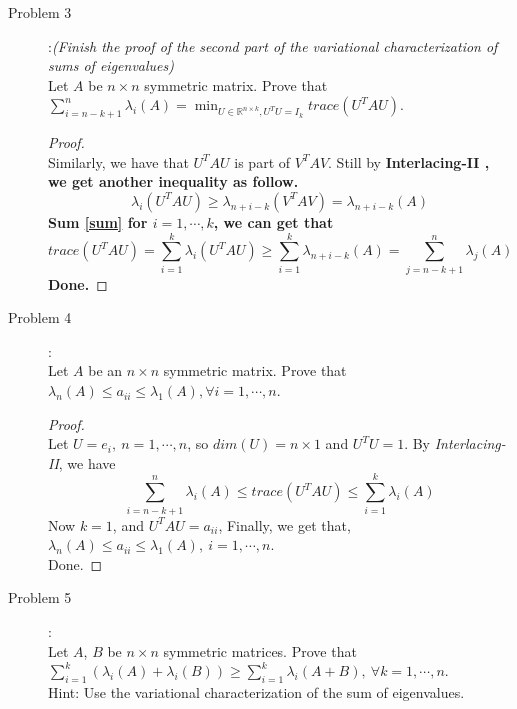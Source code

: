 \documentclass[a4paper]{article}
\begin{document}
\begin{description}
  \item[Problem 3]:\textit{(Finish the proof of the second part of the variational characterization of sums of eigenvalues)}\\
  Let $A$ be $n\times n$ symmetric matrix. Prove that $\sum_{i=n−k+1}^{n}\lambda_{i}(A)=\min_{U\in \mathbb{R}^{n×k},U^{T}U=I_{k}}trace(U^{T}AU)$.

  \begin{proof}\ \\
    Similarly, we have that $U^{T}AU$ is part of $V^{T}AV$. Still by \bfseries Interlacing-II \mdseries, we get another inequality as follow.
    \begin{equation}
      \lambda_{i}(U^{T}AU)\ge \lambda_{n+i-k}(V^{T}AV)=\lambda_{n+i-k}(A)\label{sum}
    \end{equation}
    Sum \ref{sum} for $i=1,\cdots,k$, we can get that $$trace(U^{T}AU)=\sum\limits_{i=1}^{k}\lambda_{i}(U^{T}AU)\ge \sum\limits_{i=1}^{k}\lambda_{n+i-k}(A)=\sum\limits_{j=n-k+1}^{n}\lambda_{j}(A)$$
    Done.
  \end{proof}

  \item[Problem 4]:\\
  Let $A$ be an $n\times n$ symmetric matrix. Prove that $\lambda_{n}(A)\le a_{ii}\le \lambda_{1}(A),\forall i=1,\cdots,n$.

  \begin{proof}\ \\
    Let $U=e_{i},\ n=1,\cdots,n$, so $dim(U)=n\times 1$ and $U^{T}U=1$. By \textit{Interlacing-II}, we have $$\sum\limits_{i=n-k+1}^{n}\lambda_{i}(A)\le trace(U^{T}AU)\le \sum\limits_{i=1}^{k}\lambda_{i}(A)$$
    Now $k=1$, and $U^{T}AU=a_{ii}$, Finally, we get that, $\lambda_{n}(A)\le a_{ii}\le \lambda_{1}(A),\ i=1,\cdots,n$.\\
    Done.
  \end{proof}

  \item[Problem 5]:\\
   Let $A$, $B$ be $n\times n$ symmetric matrices. Prove that $\sum^{k}_{i=1}(\lambda_{i}(A)+\lambda_{i}(B))\ge\sum_{i=1}^{k}\lambda_{i}(A+B),\ \forall k=1,\cdots,n$.\\
    Hint: Use the variational characterization of the sum of eigenvalues.


\end{description}
\end{document}
